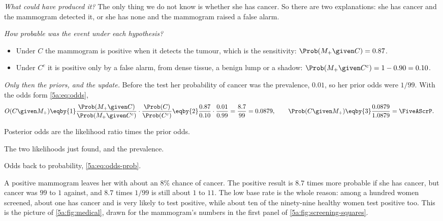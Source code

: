 \emph{What could have produced it?} The only thing we do not know is whether she has
cancer. So there are two explanations: she has cancer and the mammogram detected it,
or she has none and the mammogram raised a false alarm.

\emph{How probable was the event under each hypothesis?}
\begin{itemize}[itemsep=1pt,leftmargin=1.2em]
  \item Under $C$ the mammogram is positive when it detects the tumour, which is the
        sensitivity: $\Prob(M_+\given C)=0.87$.
  \item Under $C^c$ it is positive only by a false alarm, from dense tissue, a benign
        lump or a shadow: $\Prob(M_+\given C^c)=1-0.90=0.10$.
\end{itemize}

\emph{Only then the priors, and the update.} Before the test her probability of cancer
was the prevalence, $0.01$, so her prior odds were $1/99$. With the odds form
\eqref{5a:eq:odds},
\begin{align*}
  O(C\given M_+)
  &\eqby{1}\frac{\Prob(M_+\given C)}{\Prob(M_+\given C^c)}\cdot\frac{\Prob(C)}{\Prob(C^c)}
   \eqby{2}\frac{0.87}{0.10}\cdot\frac{0.01}{0.99}
   =\frac{8.7}{99}=0.0879,
  \qquad
  \Prob(C\given M_+)\eqby{3}\frac{0.0879}{1.0879}=\FiveAScrP .
\end{align*}
\begin{explain}
  \item Posterior odds are the likelihood ratio times the prior odds.
  \item The two likelihoods just found, and the prevalence.
  \item Odds back to probability, \eqref{5a:eq:odds-prob}.
\end{explain}
A positive mammogram leaves her with about an $8\%$ chance of cancer. The positive
result is $8.7$ times more probable if she has cancer, but cancer was $99$ to $1$
against, and $8.7$ times $1/99$ is still about $1$ to $11$. The low base rate is the
whole reason: among a hundred women screened, about one has cancer and is very likely
to test positive, while about ten of the ninety-nine healthy women test positive too.
This is the picture of \cref{5a:fig:medical}, drawn for the mammogram's numbers in the
first panel of \cref{5a:fig:screening-squares}.

